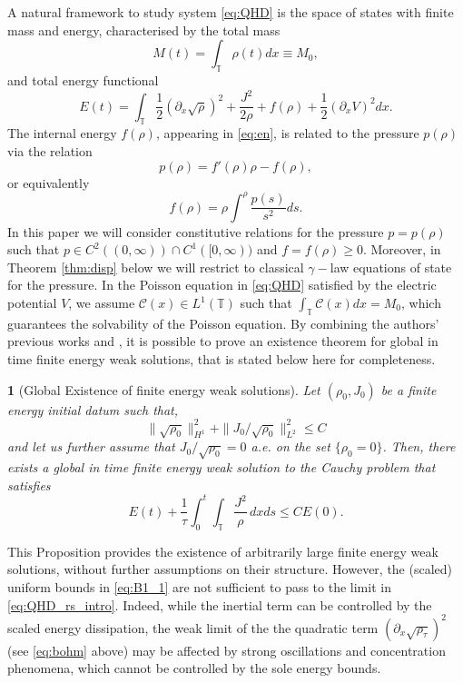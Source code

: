 \documentclass[leqno]{amsart}
\theoremstyle{plain}
\theoremstyle{definition}
\theoremstyle{remark}
\theoremstyle{plain}
\theoremstyle{plain}
\newtheorem{prop}[thm]{\protect\propositionname}
\providecommand{\propositionname}{Proposition}
\def\T{{\mathbb T}}%
\def\d{{\partial}}
\numberwithin{equation}{section}
\begin{document}
A natural framework to study system \eqref{eq:QHD} is the space of states with finite mass and energy, characterised by the total mass
\begin{equation}\label{eq:mass}
M(t)=\int_\T \rho(t)dx\equiv M_0,
\end{equation}
and total energy functional
\begin{equation}\label{eq:en}
E(t)=\int_\T \frac12(\d_x\sqrt\rho)^2+\frac{J^2}{2\rho}+f(\rho)+\frac12(\d_xV)^2dx.
\end{equation}
The internal energy $f(\rho)$, appearing in \eqref{eq:en}, is related to the pressure $p(\rho)$ via the relation
\begin{equation}\label{eq:pres}
p(\rho)=f'(\rho)\rho-f(\rho),
\end{equation}
or equivalently
\[
f(\rho)=\rho\int^\rho \frac{p(s)}{s^2}ds.
\]
In this paper we will consider constitutive relations for the pressure $p=p(\rho)$ such that $p\in C^2((0,\infty))\cap C^1([0, \infty))$ and $f=f(\rho)\geq0$. 
Moreover, in Theorem \ref{thm:disp} below we will restrict to classical $\gamma-$law equations of state for the pressure. 
In the Poisson equation in \eqref{eq:QHD} satisfied by the  electric potential $V$, we assume $\mathcal{C}(x)\in L^1(\T)$ such that $\int_\T\mathcal{C}(x)dx=M_0$, which guarantees the solvability of the Poisson equation. 
By combining the authors' previous works \cite{AM1, AM2} and \cite{AMZ1}, it is possible to prove an existence theorem for global in time finite energy weak solutions, that is stated below here for completeness. 

\begin{prop}[Global Existence of finite energy weak solutions]\label{thm:glob} 
Let $(\rho_0, J_0)$ be a finite energy initial datum such that,
\begin{equation}\label{eq:C1_intro}
\|\sqrt{\rho_0}\|_{H^1}^2+\|J_0/\sqrt{\rho_0}\|_{L^2}^2\leq C
\end{equation}
and let us further assume that $J_0/\sqrt{\rho_0}=0$ a.e. on the set $\{\rho_0=0\}$. Then, there exists a global in time finite energy weak solution to the Cauchy problem that satisfies
\begin{equation}\label{eq:B1_1}
E(t)+\frac1\tau\int_0^t\int_{\T}\frac{J^2}{\rho}\,dxds\leq C E(0).
\end{equation}
\end{prop}
This Proposition provides the existence of arbitrarily large finite energy weak solutions, without further assumptions on their structure. However, the (scaled) uniform bounds in \eqref{eq:B1_1} are not sufficient to pass to the limit in \eqref{eq:QHD_rs_intro}. Indeed, while the inertial term can be controlled by the scaled energy dissipation, the weak limit of the the quadratic term $(\d_x\sqrt{\rho_\tau})^2$ (see \eqref{eq:bohm} above) may be affected by strong oscillations and concentration phenomena, which cannot be controlled by the sole energy bounds.
\end{document}
